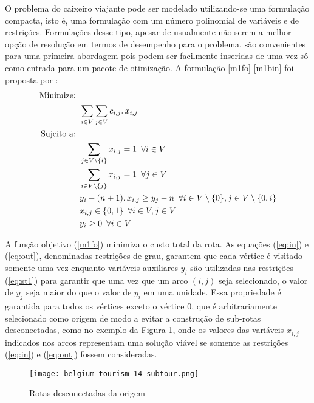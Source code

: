 \documentclass[a4paper,11pt,fleqn]{article}
\begin{document}
O problema do caixeiro viajante pode ser modelado utilizando-se uma formulação compacta, isto é, uma formulação com um número polinomial de variáveis e de restrições. 
Formulações desse tipo, apesar de usualmente não serem a melhor opção de resolução em termos de desempenho para o problema, são convenientes para uma primeira abordagem pois podem ser facilmente inseridas de uma vez só como entrada para um pacote de otimização. 
A formulação \eqref{m1fo}-\eqref{m1bin} foi proposta por \cite{Miller1960}:
\allowdisplaybreaks
\begin{align}
    \label{m1fo} \textrm{Minimize: }   & \nonumber \\
    &  \sum_{i \in V} \sum_{j \in V} c_{i,j} \ldotp x_{i,j} \\
    \textrm{Sujeito a: }   & \nonumber \\
    & \sum_{j \in V \setminus \{i\}} x_{i,j} = 1 \,\,\, \forall i \in V \label{eq:in}  \\
    & \sum_{i \in V \setminus \{j\}} x_{i,j} = 1 \,\,\, \forall j \in V \label{eq:out} \\
    & y_{i} -(n+1)\ldotp x_{i,j} \geq y_{j} -n  \,\,\, \forall i \in V\setminus \{0\}, j \in V\setminus \{0,i\} \label{eq:st1} \\
    & x_{i,j} \in \{0,1\} \,\,\, \forall i \in V, j \in V \\
    \label{m1bin} & y_i \geq 0 \,\,\, \forall i \in V 
\end{align}

A função objetivo (\ref{m1fo}) minimiza o custo total da rota. As equações (\ref{eq:in}) e (\ref{eq:out}), denominadas restrições de grau, garantem que cada vértice é visitado somente uma vez enquanto variáveis auxiliares $y_{i}$ são utilizadas nas restrições (\ref{eq:st1}) para garantir que uma vez que um arco $(i,j)$ seja selecionado, o valor de $y_{j}$ seja maior do que o valor de $y_{i}$ em uma unidade. 
Essa propriedade é garantida para todos os vértices exceto o vértice 0, que é arbitrariamente selecionado como origem de modo a evitar a construção de sub-rotas desconectadas, como no exemplo da Figura \ref{figSub}, onde os valores das variáveis $x_{i,j}$ indicados nos arcos representam uma solução viável se somente as restrições (\ref{eq:in}) e (\ref{eq:out}) fossem consideradas.

\begin{figure}[h!]
	\begin{centering}
		\texttt{[image: belgium-tourism-14-subtour.png]}
		\par\end{centering}
	\caption{Rotas desconectadas da origem}
	\label{figSub}
\end{figure}
\end{document}
